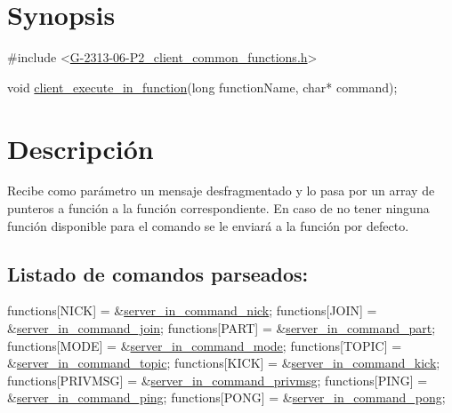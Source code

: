 \hypertarget{client_execute_in_function_synopsis_4}{}\section{Synopsis}\label{client_execute_in_function_synopsis_4}

\begin{DoxyCode}
\textcolor{preprocessor}{#include <\hyperlink{G-2313-06-P2__client__common__functions_8h}{G-2313-06-P2\_client\_common\_functions.h}>}

\textcolor{keywordtype}{void} \hyperlink{G-2313-06-P2__client_8h_a6dd72e0b56b87f85d8cac2a30066198b}{client\_execute\_in\_function}(\textcolor{keywordtype}{long} functionName, \textcolor{keywordtype}{char}* command);
\end{DoxyCode}
 \hypertarget{client_execute_in_function_descripcion_4}{}\section{Descripción}\label{client_execute_in_function_descripcion_4}
Recibe como parámetro un mensaje desfragmentado y lo pasa por un array de punteros a función a la función correspondiente. En caso de no tener ninguna función disponible para el comando se le enviará a la función por defecto. ~\newline
\subsection*{Listado de comandos parseados\+:}


\begin{DoxyCode}
functions[NICK]             = &\hyperlink{G-2313-06-P2__client__function__handlers_8h_a3271de16b2f7077059343bd6f52e4866}{server\_in\_command\_nick};
functions[JOIN]             = &\hyperlink{G-2313-06-P2__client__function__handlers_8h_a64c324e32edf01774722861d3abc7be3}{server\_in\_command\_join};
functions[PART]             = &\hyperlink{G-2313-06-P2__client__function__handlers_8h_a53568ffb9d2301140815861c2f7178ad}{server\_in\_command\_part};
functions[MODE]             = &\hyperlink{G-2313-06-P2__client__function__handlers_8h_ae5f66619469f8ea0efa0a7a5d75938dc}{server\_in\_command\_mode};
functions[TOPIC]            = &\hyperlink{G-2313-06-P2__client__function__handlers_8h_ad908abfd32d53b9483d5afa4ca18ff14}{server\_in\_command\_topic};
functions[KICK]             = &\hyperlink{G-2313-06-P2__client__function__handlers_8h_aa3d18c616914957b9794f086466788bb}{server\_in\_command\_kick};
functions[PRIVMSG]          = &\hyperlink{G-2313-06-P2__client__function__handlers_8h_a32594eebe5482f63993568825a9e126a}{server\_in\_command\_privmsg};
functions[PING]             = &\hyperlink{G-2313-06-P2__client__function__handlers_8h_a09a9d4d13037bd783036a70d5a76ac46}{server\_in\_command\_ping};
functions[PONG]             = &\hyperlink{G-2313-06-P2__client__function__handlers_8h_a06042a6459e89e0ae7586e66f8595fa3}{server\_in\_command\_pong};
\end{DoxyCode}
 ~\newline
